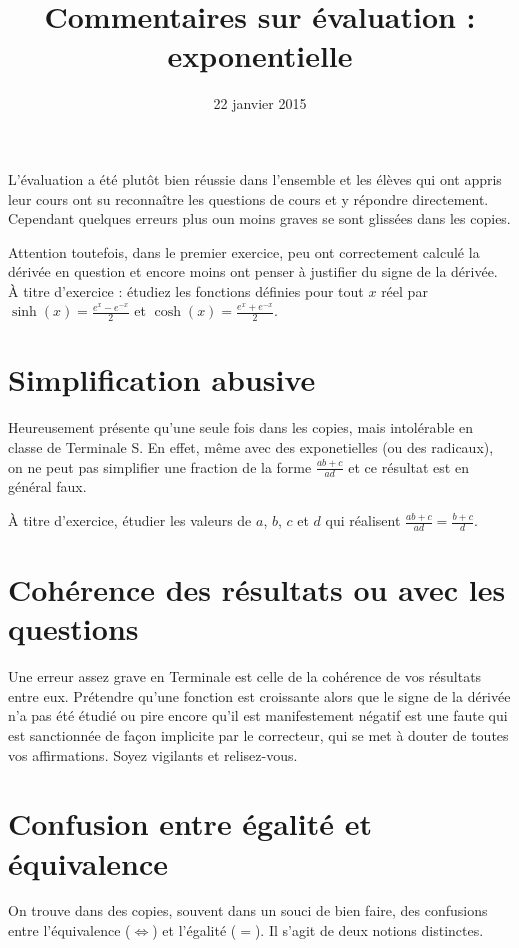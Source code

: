 \documentclass[12pt,a4paper,french]{article}
\title{Commentaires sur évaluation \no{6} : exponentielle}
\author{\bsc{Ts 3}}
\date{22 janvier 2015}
\makeatletter
\renewcommand{\maketitle}%
{\framebox{%
    \begin{minipage}{1.0\linewidth}%
      \begin{center}%
        \Large \@title ~-- \@author \\%
        \@date%
      \end{center}%
    \end{minipage}}%
  \normalsize%
}
\theoremstyle{break}
\theoremstyle{plain}
\theoremstyle{nonumberplain}
\theoremstyle{nonumberbreak}
\makeatother
\begin{document}
\maketitle

L'évaluation a été plutôt bien réussie dans l'ensemble et les élèves qui
ont appris leur cours ont su reconnaître les questions de cours et y
répondre directement. Cependant quelques erreurs plus oun moins graves
se sont glissées dans les copies.

Attention toutefois, dans le premier exercice, peu ont correctement
calculé la dérivée en question et encore moins ont penser à justifier du
signe de la dérivée. À titre d'exercice : étudiez les fonctions définies
pour tout $x$ réel par $\sinh(x) = \frac{e^x - e^{-x}}2$ et $\cosh(x) =
\frac{e^x + e^{-x}}2$.

\section{Simplification abusive}

Heureusement présente qu'une seule fois dans les copies, mais
intolérable en classe de Terminale S. En effet, même avec des
exponetielles (ou des radicaux), on ne peut pas simplifier une fraction
de la forme $\frac{ab + c}{ad}$ et ce résultat est en général faux.

À titre d'exercice, étudier les valeurs de $a$, $b$, $c$ et $d$ qui
réalisent $\frac{ab + c}{ad} = \frac{b+c}{d}$.

\section{Cohérence des résultats ou avec les questions}

Une erreur assez grave en Terminale est celle de la cohérence de vos
résultats entre eux. Prétendre qu'une fonction est croissante alors que
le signe de la dérivée n'a pas été étudié ou pire encore qu'il est
manifestement négatif est une faute qui est sanctionnée de façon
implicite par le correcteur, qui se met à douter de toutes vos
affirmations. Soyez vigilants et relisez-vous.

\section{Confusion entre égalité et équivalence}

On trouve dans des copies, souvent dans un souci de bien faire, des
confusions entre l'équivalence ($\iff$) et l'égalité ($=$). Il s'agit de
deux notions distinctes.
\end{document}
